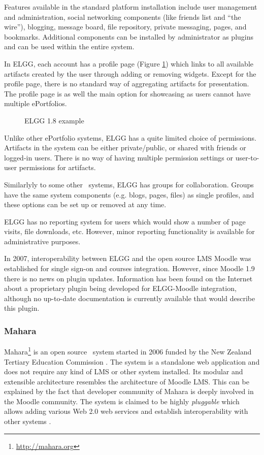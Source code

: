 Features available in the standard platform installation include user management
and administration, social networking components (like friends list and ``the
wire''), blogging, message board, file repository, private messaging, pages, and
bookmarks. Additional components can be installed by administrator as plugins
and can be used within the entire system.

In ELGG, each account has a profile page (Figure \ref{fig:elgg}) which links to
all available artifacts created by the user through adding or removing widgets.
Except for the profile page, there is no standard way of aggregating artifacts
for presentation. The profile page is as well the main option for showcasing as
users cannot have multiple ePortfolios.

\begin{figure}[htb]
\centering
\setlength\fboxsep{0pt}
\setlength\fboxrule{0.5pt}
\caption{ELGG 1.8 example}
\label{fig:elgg}
\end{figure}

Unlike other ePortfolio systems, ELGG has a quite limited choice of permissions.
Artifacts in the system can be either private/public, or shared with friends
or logged-in users. There is no way of having multiple permission settings or
user-to-user permissions for artifacts.

Similarlyly to some other \ep~systems, ELGG has groups for collaboration. Groups
have the same system components (e.g. blogs, pages, files) as single profiles,
and these options can be set up or removed at any time.

ELGG has no reporting system for users which would show a number of page
visits, file downloads, etc. However, minor reporting functionality is available
for administrative purposes.

In 2007, interoperability between ELGG and the open source LMS Moodle was
established for single sign-on and courses integration. However, since Moodle
1.9 there is no news on plugin updates. Information has been found on the
Internet about a proprietary plugin being developed for ELGG-Moodle integration,
although no up-to-date documentation is currently available that would describe
this plugin.
 
\subsubsection{Mahara}
Mahara\footnote{\url{http://mahara.org}} is an open source \ep~system started in
2006 funded by the New Zealand Tertiary Education Commission \citep{Brown2007}.
The system is a standalone web application and does not require any kind of LMS
or other system installed. Its modular and extensible architecture resembles the
architecture of Moodle LMS. This can be explained by the fact that developer
community of Mahara is deeply involved in the Moodle community. The system is
claimed to be highly \textit{pluggable} which allows adding various Web 2.0 web
services and establish interoperability with other systems
\citep{MaharaGovernanceGroup2011}.

